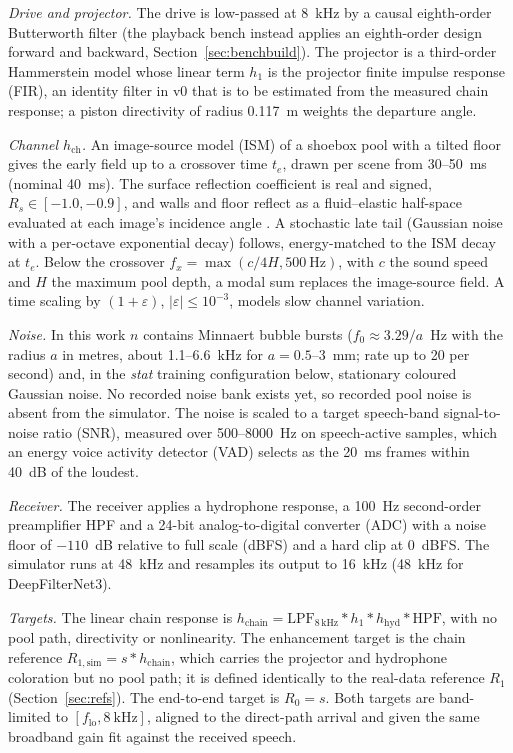 \documentclass[conference]{IEEEtran}
\begin{document}
\textit{Drive and projector.} The drive is low-passed at 8~kHz by a causal eighth-order Butterworth
filter (the playback bench instead applies an eighth-order design forward and backward,
Section~\ref{sec:benchbuild}). The projector is a third-order Hammerstein model whose linear term $h_1$
is the projector finite impulse response (FIR), an identity filter in v0 that is to be estimated from
the measured chain response; a piston directivity of radius 0.117~m weights the departure angle.

\textit{Channel $h_{\mathrm{ch}}$.} An image-source model (ISM) \cite{allen1979} of a
shoebox pool with a tilted floor gives the early field up to a crossover time $t_e$, drawn per scene from 30--50~ms (nominal
40~ms). The surface reflection
coefficient is real and signed, $R_s \in [-1.0, -0.9]$, and walls and floor reflect as a fluid--elastic
half-space evaluated at each image's incidence angle \cite{brekhovskikh1980}. A stochastic late tail (Gaussian noise with a per-octave exponential
decay) follows, energy-matched to the ISM decay at $t_e$. Below the crossover
$f_x = \max(c/4H, 500~\mathrm{Hz})$, with $c$ the sound speed and $H$ the maximum pool depth, a
modal sum replaces the image-source field. A time scaling by $(1+\varepsilon)$, $|\varepsilon| \le
10^{-3}$, models slow channel variation.

\textit{Noise.} In this work $n$ contains Minnaert bubble bursts \cite{minnaert1933}
($f_0 \approx 3.29/a$~Hz with the radius $a$ in metres, about 1.1--6.6~kHz for $a = 0.5$--$3$~mm;
rate up to 20 per second) and, in the
\emph{stat} training configuration below, stationary coloured Gaussian noise. No recorded noise bank
exists yet, so recorded pool noise is absent from the simulator. The noise is scaled to a
target speech-band signal-to-noise ratio (SNR), measured over 500--8000~Hz on speech-active samples,
which an energy voice activity detector (VAD) selects as the 20~ms frames within 40~dB of the loudest.

\textit{Receiver.} The receiver applies a hydrophone response, a 100~Hz second-order preamplifier
HPF and a 24-bit analog-to-digital converter (ADC) with a noise floor of $-110$~dB relative to full
scale (dBFS) and a hard clip at 0~dBFS. The
simulator runs at 48~kHz and resamples its output to 16~kHz (48~kHz for DeepFilterNet3).

\textit{Targets.} The linear chain response is $h_{\mathrm{chain}} = \mathrm{LPF}_{8\,\mathrm{kHz}}
* h_1 * h_{\mathrm{hyd}} * \mathrm{HPF}$, with no pool path, directivity or nonlinearity. The
enhancement target is the chain reference $R_{1,\mathrm{sim}} = s * h_{\mathrm{chain}}$, which carries
the projector and hydrophone coloration but no pool path; it is defined identically to the real-data
reference $R_1$ (Section~\ref{sec:refs}). The end-to-end target is $R_0 = s$. Both targets are
band-limited to $[f_{\mathrm{lo}}, 8~\mathrm{kHz}]$, aligned to the direct-path arrival and given the
same broadband gain fit against the received speech.
\end{document}
